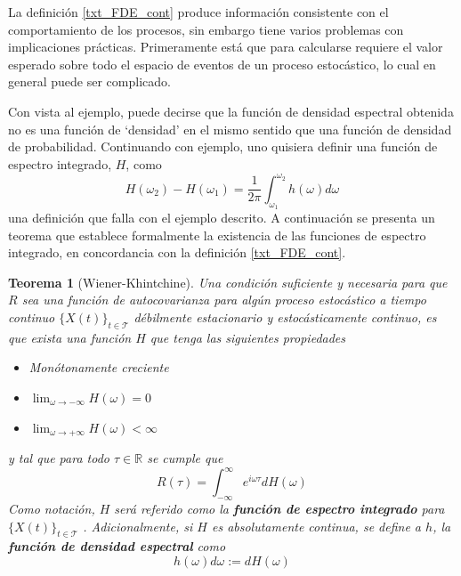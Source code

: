 \documentclass[12pt,letterpaper]{book}
\newtheorem{teorema}{Teorema}[chapter]
\newcommand{\R}{\mathbb{R}}
\newcommand{\intR}{\int_{-\infty}^{\infty}}
\newcommand{\xt}{$\{X(t)\}_{t\in \mathcal{T}}$ }
\begin{document}
La definición \ref{txt_FDE_cont} produce información consistente con el comportamiento de los procesos, sin embargo tiene varios problemas con implicaciones prácticas.
%
Primeramente está que para calcularse requiere el valor esperado sobre todo el espacio de eventos de un proceso estocástico, lo cual en general puede ser complicado.

Con vista al ejemplo, puede decirse que la función de densidad espectral obtenida no es una función de `densidad' en el mismo sentido que una función de densidad de probabilidad.
%
Continuando con ejemplo, uno quisiera definir una función de espectro integrado, $H$, como
\begin{equation}
H(\omega_2) - H(\omega_1) = \frac{1}{2 \pi} \int_{\omega_1}^{\omega_2} h(\omega) d\omega
\end{equation}
una definición que falla con el ejemplo descrito. A continuación se presenta un teorema que establece formalmente la existencia de las funciones de espectro integrado, en concordancia con la definición \ref{txt_FDE_cont}.

\begin{teorema}[Wiener-Khintchine]
Una condición suficiente y necesaria para que $R$ sea una función de autocovarianza para algún proceso estocástico a tiempo continuo \xt débilmente estacionario y estocásticamente continuo, es que exista una función $H$ que tenga las siguientes propiedades
\begin{itemize}
\item Monótonamente creciente
\item $\lim_{\omega\rightarrow -\infty} H(\omega) = 0$
\item $\lim_{\omega\rightarrow +\infty} H(\omega) < \infty$
\end{itemize}
y tal que para todo $\tau \in \R$ se cumple que
\begin{equation*}
R(\tau) = \intR e^{i \omega \tau} dH(\omega)
\end{equation*}
Como notación, $H$ será referido como la \textbf{función de espectro integrado} para \xt.
%
Adicionalmente, si $H$ es absolutamente continua, se define a $h$, la \textbf{función de densidad espectral} como
\begin{equation}
h(\omega) d\omega := dH(\omega)
\end{equation}
\label{t_wienerkhinchin}
\end{teorema}

\end{document}
